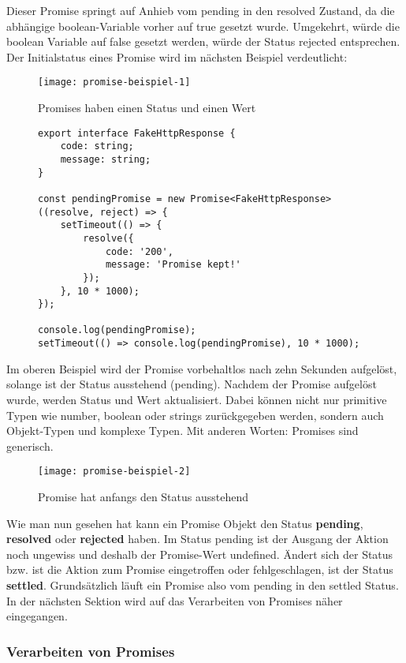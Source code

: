 \noindent
Dieser Promise springt auf Anhieb vom pending in den resolved Zustand, da die abhängige boolean-Variable vorher auf true gesetzt wurde. Umgekehrt, würde die boolean Variable auf false gesetzt werden, würde der Status rejected entsprechen. Der Initialstatus eines Promise wird im nächsten Beispiel verdeutlicht:

\begin{figure}[H]
\centering
\texttt{[image: promise-beispiel-1]}
\caption{Promises haben einen Status und einen Wert}
\end{figure}

\begin{figure}[H]
\begin{lstlisting}
export interface FakeHttpResponse {
    code: string;
    message: string;
}

const pendingPromise = new Promise<FakeHttpResponse>((resolve, reject) => {
    setTimeout(() => {
        resolve({
            code: '200',
            message: 'Promise kept!'
        });
    }, 10 * 1000);
});

console.log(pendingPromise);
setTimeout(() => console.log(pendingPromise), 10 * 1000);
\end{lstlisting}
\end{figure}

\noindent
Im oberen Beispiel wird der Promise vorbehaltlos nach zehn Sekunden aufgelöst, solange ist der Status ausstehend (pending). Nachdem der Promise aufgelöst wurde, werden Status und Wert aktualisiert. Dabei können nicht nur primitive Typen wie number, boolean oder strings zurückgegeben werden, sondern auch Objekt-Typen und komplexe Typen. Mit anderen Worten: Promises sind generisch.

\begin{figure}[H]
\centering
\texttt{[image: promise-beispiel-2]}
\caption{Promise hat anfangs den Status \glqq{}ausstehend\grqq{}}
\end{figure}

\noindent
Wie man nun gesehen hat kann ein Promise Objekt den Status  \textbf{pending}, \textbf{resolved} oder \textbf{rejected} haben. Im Status pending ist der Ausgang der Aktion noch ungewiss und deshalb der Promise-Wert undefined. Ändert sich der Status bzw. ist die Aktion zum Promise eingetroffen oder fehlgeschlagen, ist der Status \textbf{settled}. Grundsätzlich läuft ein Promise also vom pending in den settled Status. In der nächsten Sektion wird auf das Verarbeiten von Promises näher eingegangen.

\subsubsection{Verarbeiten von Promises}

